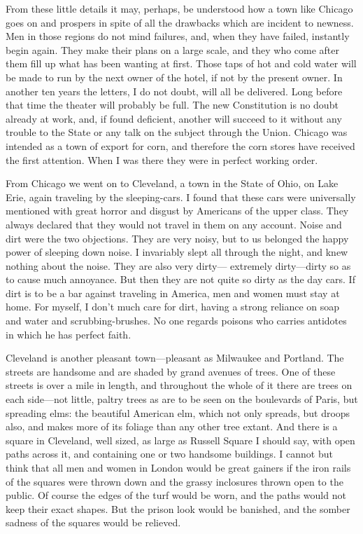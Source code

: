 From these little details it may, perhaps, be understood how a town
like Chicago goes on and prospers in spite of all the drawbacks
which are incident to newness.  Men in those regions do not mind
failures, and, when they have failed, instantly begin again.  They
make their plans on a large scale, and they who come after them
fill up what has been wanting at first.  Those taps of hot and cold
water will be made to run by the next owner of the hotel, if not by
the present owner.  In another ten years the letters, I do not
doubt, will all be delivered.  Long before that time the theater
will probably be full.  The new Constitution is no doubt already at
work, and, if found deficient, another will succeed to it without
any trouble to the State or any talk on the subject through the
Union.  Chicago was intended as a town of export for corn, and
therefore the corn stores have received the first attention.  When
I was there they were in perfect working order.

From Chicago we went on to Cleveland, a town in the State of Ohio,
on Lake Erie, again traveling by the sleeping-cars.  I found that
these cars were universally mentioned with great horror and disgust
by Americans of the upper class.  They always declared that they
would not travel in them on any account.  Noise and dirt were the
two objections.  They are very noisy, but to us belonged the happy
power of sleeping down noise.  I invariably slept all through the
night, and knew nothing about the noise.  They are also very dirty---%
extremely dirty---dirty so as to cause much annoyance.  But then
they are not quite so dirty as the day cars.  If dirt is to be a
bar against traveling in America, men and women must stay at home.
For myself, I don't much care for dirt, having a strong reliance on
soap and water and scrubbing-brushes.  No one regards poisons who
carries antidotes in which he has perfect faith.

Cleveland is another pleasant town---pleasant as Milwaukee and
Portland.  The streets are handsome and are shaded by grand avenues
of trees.  One of these streets is over a mile in length, and
throughout the whole of it there are trees on each side---not
little, paltry trees as are to be seen on the boulevards of Paris,
but spreading elms: the beautiful American elm, which not only
spreads, but droops also, and makes more of its foliage than any
other tree extant.  And there is a square in Cleveland, well sized,
as large as Russell Square I should say, with open paths across it,
and containing one or two handsome buildings.  I cannot but think
that all men and women in London would be great gainers if the iron
rails of the squares were thrown down and the grassy inclosures
thrown open to the public.  Of course the edges of the turf would
be worn, and the paths would not keep their exact shapes.  But the
prison look would be banished, and the somber sadness of the
squares would be relieved.

